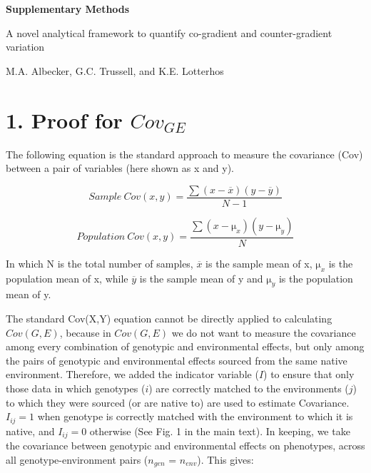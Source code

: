 \documentclass[11pt, oneside]{amsart}
\begin{document}


{ \Large \bf Supplementary Methods}

A novel analytical framework to quantify co-gradient and counter-gradient variation 

M.A. Albecker, G.C. Trussell, and K.E. Lotterhos

\hspace{3cm}

\tableofcontents

\newpage

\renewcommand\thesection{Supplemental Methods}

\section{1. Proof for $Cov_{GE}$}

The following equation is the standard approach to measure the covariance (Cov) between a pair of variables (here shown as x and y).

\begin{equation}
Sample\:Cov(x,y) =  \frac{\sum (x - \overline{x})(y - \overline{y})}{N-1}
\end{equation}

\begin{equation}
Population\:Cov(x,y) =  \frac{\sum (x - \si\micro_{x})(y - \si\micro_{y})}{N}
\end{equation}

In which N is the total number of samples, $\overline{x}$ is the sample mean of x, $\si\micro_{x}$ is the population mean of x, while $\overline{y}$ is the sample mean of y and $\si\micro_{y}$ is the population mean of y. 

The standard Cov(X,Y) equation cannot be directly applied to calculating $Cov(G,E)$, because in $Cov(G,E)$ we do not want to measure the covariance among every combination of genotypic and environmental effects, but only among the pairs of genotypic and environmental effects sourced from the same native environment. Therefore, we added the indicator variable ($I$) to ensure that only those data in which genotypes ($i$) are correctly matched to the environments ($j$) to which they were sourced (or are native to) are used to estimate Covariance.  $I_{ij} = 1$ when genotype is correctly matched with the environment to which it is native, and $I_{ij} = 0$ otherwise (See Fig. 1 in the main text). In keeping, we take the covariance between genotypic and environmental effects on phenotypes, across all genotype-environment pairs ($n_{gen}$ = $n_{env}$). This gives: 
\end{document}
